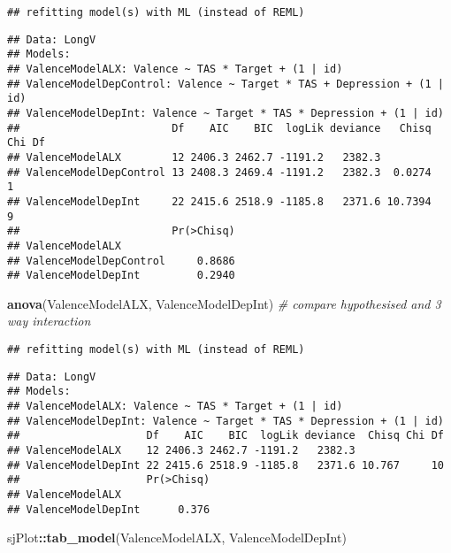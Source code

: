 \documentclass[]{article}
\newenvironment{Shaded}{\begin{snugshade}}{\end{snugshade}}
\newcommand{\CommentTok}[1]{\textcolor[rgb]{0.56,0.35,0.01}{\textit{#1}}}
\newcommand{\KeywordTok}[1]{\textcolor[rgb]{0.13,0.29,0.53}{\textbf{#1}}}
\newcommand{\NormalTok}[1]{#1}
\newcommand{\OperatorTok}[1]{\textcolor[rgb]{0.81,0.36,0.00}{\textbf{#1}}}
\begin{document}
\begin{verbatim}
## refitting model(s) with ML (instead of REML)
\end{verbatim}

\begin{verbatim}
## Data: LongV
## Models:
## ValenceModelALX: Valence ~ TAS * Target + (1 | id)
## ValenceModelDepControl: Valence ~ Target * TAS + Depression + (1 | id)
## ValenceModelDepInt: Valence ~ Target * TAS * Depression + (1 | id)
##                        Df    AIC    BIC  logLik deviance   Chisq Chi Df
## ValenceModelALX        12 2406.3 2462.7 -1191.2   2382.3               
## ValenceModelDepControl 13 2408.3 2469.4 -1191.2   2382.3  0.0274      1
## ValenceModelDepInt     22 2415.6 2518.9 -1185.8   2371.6 10.7394      9
##                        Pr(>Chisq)
## ValenceModelALX                  
## ValenceModelDepControl     0.8686
## ValenceModelDepInt         0.2940
\end{verbatim}

\begin{Shaded}
\begin{Highlighting}[]
\KeywordTok{anova}\NormalTok{(ValenceModelALX, ValenceModelDepInt) }\CommentTok{# compare hypothesised and 3 way interaction}
\end{Highlighting}
\end{Shaded}

\begin{verbatim}
## refitting model(s) with ML (instead of REML)
\end{verbatim}

\begin{verbatim}
## Data: LongV
## Models:
## ValenceModelALX: Valence ~ TAS * Target + (1 | id)
## ValenceModelDepInt: Valence ~ Target * TAS * Depression + (1 | id)
##                    Df    AIC    BIC  logLik deviance  Chisq Chi Df
## ValenceModelALX    12 2406.3 2462.7 -1191.2   2382.3              
## ValenceModelDepInt 22 2415.6 2518.9 -1185.8   2371.6 10.767     10
##                    Pr(>Chisq)
## ValenceModelALX              
## ValenceModelDepInt      0.376
\end{verbatim}

\begin{Shaded}
\begin{Highlighting}[]
\NormalTok{sjPlot}\OperatorTok{::}\KeywordTok{tab_model}\NormalTok{(ValenceModelALX, ValenceModelDepInt) }
\end{Highlighting}
\end{Shaded}
\end{document}
